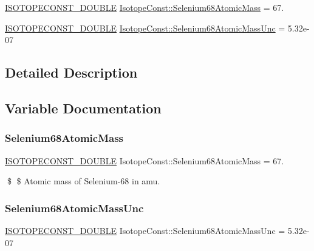 \begin{DoxyCompactItemize}
\item 
\mbox{\hyperlink{group___isotope_const-_macros_ga8f45a7272ce02c0b4c65c44636ed719a}{I\+S\+O\+T\+O\+P\+E\+C\+O\+N\+S\+T\+\_\+\+D\+O\+U\+B\+LE}} \mbox{\hyperlink{group___isotope_const-_selenium-_se68_ga09682258b4b8faec4ef5778a436620a2}{Isotope\+Const\+::\+Selenium68\+Atomic\+Mass}} = 67.
\item 
\mbox{\hyperlink{group___isotope_const-_macros_ga8f45a7272ce02c0b4c65c44636ed719a}{I\+S\+O\+T\+O\+P\+E\+C\+O\+N\+S\+T\+\_\+\+D\+O\+U\+B\+LE}} \mbox{\hyperlink{group___isotope_const-_selenium-_se68_ga24e63e464d6ce4c5d40f22e50559b375}{Isotope\+Const\+::\+Selenium68\+Atomic\+Mass\+Unc}} = 5.\+32e-\/07
\end{DoxyCompactItemize}


\subsection{Detailed Description}


\subsection{Variable Documentation}
\mbox{\label{group___isotope_const-_selenium-_se68_ga09682258b4b8faec4ef5778a436620a2}} 
\subsubsection{\texorpdfstring{Selenium68\+Atomic\+Mass}{Selenium68AtomicMass}}
{\footnotesize\ttfamily \mbox{\hyperlink{group___isotope_const-_macros_ga8f45a7272ce02c0b4c65c44636ed719a}{I\+S\+O\+T\+O\+P\+E\+C\+O\+N\+S\+T\+\_\+\+D\+O\+U\+B\+LE}} Isotope\+Const\+::\+Selenium68\+Atomic\+Mass = 67.}

\$ \$ Atomic mass of Selenium-\/68 in amu. \mbox{\label{group___isotope_const-_selenium-_se68_ga24e63e464d6ce4c5d40f22e50559b375}} 
\subsubsection{\texorpdfstring{Selenium68\+Atomic\+Mass\+Unc}{Selenium68AtomicMassUnc}}
{\footnotesize\ttfamily \mbox{\hyperlink{group___isotope_const-_macros_ga8f45a7272ce02c0b4c65c44636ed719a}{I\+S\+O\+T\+O\+P\+E\+C\+O\+N\+S\+T\+\_\+\+D\+O\+U\+B\+LE}} Isotope\+Const\+::\+Selenium68\+Atomic\+Mass\+Unc = 5.\+32e-\/07}

